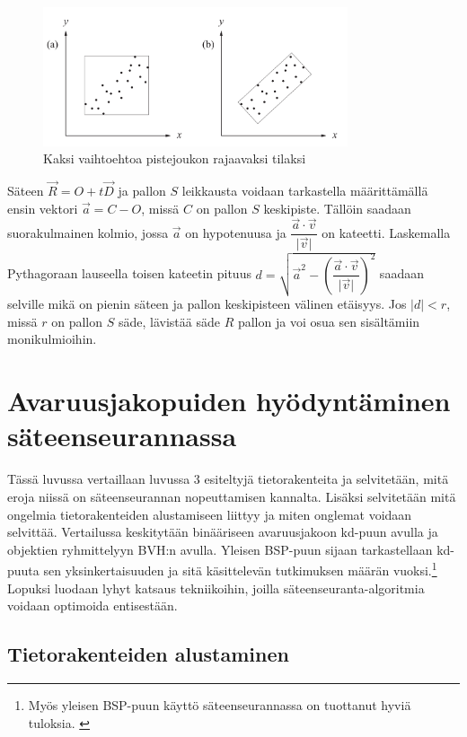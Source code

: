\documentclass[a4paper, 12pt, titlepage]{article}
\newcommand{\abs}[1]{\vert #1 \vert} %
\begin{document}
\begin{figure}
 \centering 
 \includegraphics[width=0.8\textwidth]{img/bvh1.png}
 \vspace{0.4cm}
 \caption{Kaksi vaihtoehtoa pistejoukon rajaavaksi tilaksi \citep{lengyel}}%
 \vspace{-0.5cm} 
 \label{bvh1}
\end{figure}

Säteen $\vec{R}=O+t\vec{D}$ ja pallon $S$ leikkausta voidaan tarkastella määrittämällä ensin vektori $\vec{a} = C - O$, missä $C$ on pallon $S$ keskipiste. Tällöin saadaan suorakulmainen kolmio, jossa $\vec{a}$ on hypotenuusa ja $\dfrac{\vec{a}\cdot\vec{v}}{\abs{\vec{v}}}$ on kateetti. Laskemalla Pythagoraan lauseella toisen kateetin pituus $d = \sqrt{\vec{a}^2 - (\dfrac{\vec{a}\cdot\vec{v}}{\abs{\vec{v}}})^2}$ saadaan selville mikä on pienin säteen ja pallon keskipisteen välinen etäisyys. Jos $\abs{d} < r$, missä $r$ on pallon $S$ säde, lävistää säde $R$ pallon ja voi osua sen sisältämiin monikulmioihin. \citep[.]{janke}    


\newpage
\section{Avaruusjakopuiden hyödyntäminen säteenseurannassa}

Tässä luvussa vertaillaan luvussa 3 esiteltyjä tietorakenteita ja selvitetään, mitä eroja niissä on säteenseurannan nopeuttamisen kannalta. Lisäksi selvitetään mitä ongelmia tietorakenteiden alustamiseen liittyy ja miten onglemat voidaan selvittää. Vertailussa keskitytään binääriseen avaruusjakoon kd-puun avulla ja objektien ryhmittelyyn BVH:n avulla. Yleisen BSP-puun sijaan tarkastellaan kd-puuta sen yksinkertaisuuden ja sitä käsittelevän tutkimuksen määrän vuoksi.\footnote{Myös yleisen BSP-puun käyttö säteenseurannassa on tuottanut hyviä tuloksia. \citep[ks. esim.][]{ranta}} Lopuksi luodaan lyhyt katsaus tekniikoihin, joilla säteenseuranta-algoritmia voidaan optimoida entisestään.

\subsection{Tietorakenteiden alustaminen}
\end{document}
